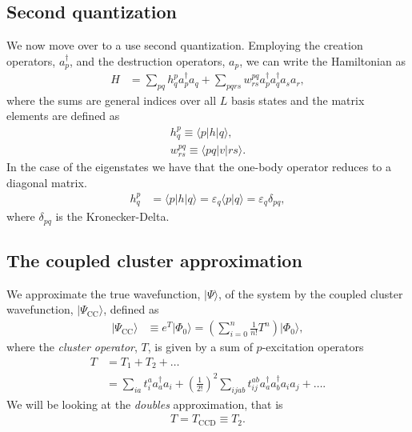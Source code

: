 \documentclass[
    a4paper, aps, twocolumn, floatfix, superscriptaddress,
    nofootinbib]{revtex4-1}
\newcommand{\1}{\mathds{1}}
\newcommand{\para}[1]{\left(#1\right)}
\newcommand{\bra}[1]{\langle #1\lvert}
\newcommand{\ket}[1]{\rvert #1\rangle}
\newcommand{\braket}[2]{\langle #1 \vert #2 \rangle}
\newcommand{\acr}[1]{a_{#1}^{\dagger}}
\newcommand{\ade}[1]{a_{#1}}
\begin{document}
    \subsection{Second quantization}
        We now move over to a use second quantization. Employing the creation
        operators, $\acr{p}$, and the destruction operators, $\ade{p}$, we can
        write the Hamiltonian as
        \begin{align}
            H
            &=
            \sum_{pq}h_{q}^{p}\acr{p}\ade{q}
            + \sum_{pqrs}w_{rs}^{pq}\acr{p}\acr{q}\ade{s}\ade{r},
        \end{align}
        where the sums are general indices over all $L$ basis states and the
        matrix elements are defined as
        \begin{gather}
            h^{p}_{q} \equiv \bra{p}h\ket{q}, \\
            w_{rs}^{pq} \equiv \bra{pq}v\ket{rs}.
        \end{gather}
        In the case of the eigenstates we have that the one-body operator
        reduces to a diagonal matrix.
        \begin{align}
            h^{p}_{q}
            &= \bra{p}h\ket{q}
            = \varepsilon_q\braket{p}{q}
            = \varepsilon_q\delta_{pq},
        \end{align}
        where $\delta_{pq}$ is the Kronecker-Delta.

    \subsection{The coupled cluster approximation}
        We approximate the true wavefunction, $\ket{\Psi}$, of the system by the
        coupled cluster wavefunction, $\ket{\Psi_{\text{CC}}}$, defined as
        \begin{align}
            \ket{\Psi_{\text{CC}}}
            &\equiv e^{T}\ket{\Phi_0}
            = \para{
                \sum_{i = 0}^n
                \frac{1}{n!}T^n
            }\ket{\Phi_0},
        \end{align}
        where the \emph{cluster operator}, $T$, is given by a sum of
        $p$-excitation operators
        \begin{align}
            T &= T_1 + T_2 + \dots \\
            &=
            \sum_{ia}t_i^a\acr{a}\ade{i}
            + \para{\frac{1}{2!}}^2\sum_{ijab}
            t_{ij}^{ab}\acr{a}\acr{b}\ade{i}\ade{j}
            + \dots.
        \end{align}
        We will be looking at the \emph{doubles} approximation, that is
        \begin{align}
            T = T_{\text{CCD}} \equiv T_2.
        \end{align}
\end{document}

